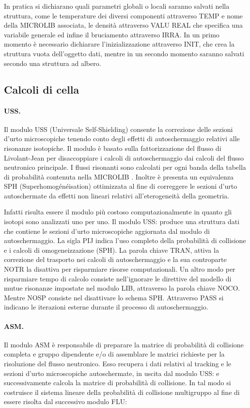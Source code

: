 In pratica si dichiarano quali parametri globali o locali saranno salvati nella 
struttura, come le temperature dei diversi componenti attraverso 
TEMP e nome della MICROLIB associata, le densità attraverso VALU REAL che 
specifica una variabile generale ed infine il bruciamento attraverso IRRA.
In un primo momento è necessario dichiarare l'inizializzazione attraverso INIT, 
che crea la struttura vuota dell'oggetto dati, mentre in un secondo momento 
saranno salvati secondo una struttura ad albero.


\subsection{Calcoli di cella}

\paragraph{USS.}
Il modulo USS (Universale Self-Shielding) consente la correzione delle sezioni 
d'urto microscopiche tenendo conto degli effetti di autoschermaggio relativi 
alle risonanze isotopiche.
Il modulo è basato sulla fattorizzazione del flusso di Livolant-Jean per 
disaccoppiare i calcoli di autoschermaggio dai calcoli del flusso neutronico 
principale. I flussi risonanti sono calcolati per ogni banda della tabella di 
probabilità contenuta nella MICROLIB \cite{hebert2002computing}.
Inoltre è presenta un equivalenza SPH (Superhomogénéisation) ottimizzata al 
fine di correggere le sezioni d'urto autoschermate da effetti non lineari 
relativi all'eterogeneità della geometria.

Infatti risulta essere il modulo più costoso computazionalmente in quanto gli 
isotopi sono analizzati uno per uno.
Il modulo USS: produce una struttura dati che contiene le sezioni d'urto 
microscopiche aggiornata dal modulo di autoschermaggio.
La sigla PIJ indica l'uso completo della 
probabilità di collisione e i calcoli di omogeneizzazione (SPH).
La parola chiave TRAN, attiva la correzione del trasporto nei calcoli di 
autoschermaggio e la sua controparte NOTR la disattiva per risparmiare 
risorse computazionali.
Un altro modo per risparmiare tempo di calcolo consiste nell'ignorare le 
direttive del modello di mutue risonanze impostate nel modulo LIB, attraverso 
la parola chiave NOCO. Mentre NOSP consiste nel disattivare lo schema SPH.
Attraverso PASS si indicano le iterazioni esterne durante il processo di 
autoschermaggio.

\paragraph{ASM.}
Il modulo ASM è responsabile di preparare la matrice di probabilità di 
collisione completa e gruppo dipendente e/o di assemblare le matrici richieste 
per la risoluzione del flusso neutronico.
Esso recupera i dati relativi al tracking e le sezioni d'urto microscopiche 
autoschermate, in uscita dal modulo USS: e successivamente calcola la matrice 
di 
probabilità di collisione.
In tal modo si costruisce il sistema lineare della probabilità di collisione 
multigruppo al fine di essere risolta dal successivo modulo FLU:

